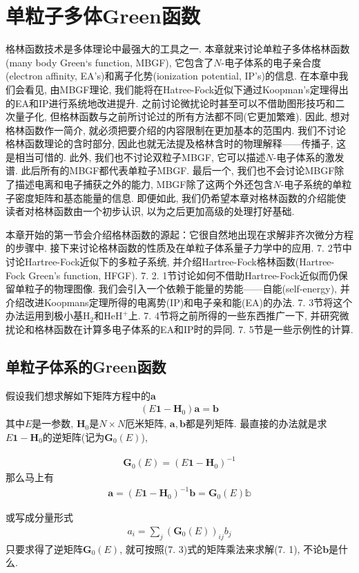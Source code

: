 \chapter{单粒子多体Green函数}
格林函数技术是多体理论中最强大的工具之一. 
本章就来讨论单粒子多体格林函数(many body Green`s function, 
MBGF), 
它包含了$N$-电子体系的电子亲合度(electron affinity, 
EA's)和离子化势(ionization potential, 
IP's)的信息. 
在本章中我们会看见, 
由MBGF理论, 
我们能将在Hatree-Fock近似下通过Koopman's定理得出的EA和IP进行系统地改进提升. 
之前讨论微扰论时甚至可以不借助图形技巧和二次量子化, 
但格林函数与之前所讨论过的所有方法都不同(它更加繁难). 
因此, 
想对格林函数作一简介, 
就必须把要介绍的内容限制在更加基本的范围内. 
我们不讨论格林函数理论的含时部分, 
因此也就无法提及格林含时的物理解释——传播子, 
这是相当可惜的. 
此外, 
我们也不讨论双粒子MBGF, 
它可以描述$N$-电子体系的激发谱. 
此后所有的MBGF都代表单粒子MBGF. 
最后一个, 
我们也不会讨论MBGF除了描述电离和电子捕获之外的能力, 
MBGF除了这两个外还包含$N$-电子系统的单粒子密度矩阵和基态能量的信息. 
即便如此, 
我们仍希望本章对格林函数的介绍能使读者对格林函数由一个初步认识, 
以为之后更加高级的处理打好基础.


本章开始的第一节会介绍格林函数的源起：它很自然地出现在求解非齐次微分方程的步骤中. 
接下来讨论格林函数的性质及在单粒子体系量子力学中的应用. 
7.
2节中讨论Hartree-Fock近似下的多粒子系统, 
并介绍Hartree-Fock格林函数(Hartree-Fock Green's function, 
HFGF). 
7.
2.
1节讨论如何不借助Hartree-Fock近似而仍保留单粒子的物理图像. 
我们会引入一个依赖于能量的势能——自能(self-energy), 
并介绍改进Koopmans定理所得的电离势(IP)和电子亲和能(EA)的办法. 
7.
3节将这个办法运用到极小基$\mathrm{H}_2$和$\mathrm{HeH}^+$上. 
7.
4节将之前所得的一些东西推广一下, 
并研究微扰论和格林函数在计算多电子体系的EA和IP时的异同. 
7.
5节是一些示例性的计算.

\section{单粒子体系的Green函数}
假设我们想求解如下矩阵方程中的$\mathbf{a}$
\begin{align}
(E\mathbf{1} - \mathbf{H}_0)\mathbf{a} = \mathbf{b}
\end{align}
其中$E$是一参数, 
$\mathbf{H}_0$是$N\times N$厄米矩阵, 
$\mathbf{a,b}$都是列矩阵. 
最直接的办法就是求$E\mathbf{1} - \mathbf{H}_0$的逆矩阵(记为$\mathbf{G}_0(E)$),

\begin{align}
\mathbf{G}_0(E) = (E\mathbf{1} - \mathbf{H}_0)^{-1}
\end{align}
那么马上有
\begin{align}
\mathbf{a} = (E\mathbf{1} - \mathbf{H}_0)^{-1}\mathbf{b} = \mathbf{G}_0(E)\mathbb{b}\tag{7.3a}
\end{align}
\addtocounter{equation}{1}
或写成分量形式
\begin{align}
a_i = \sum_j (\mathbf{G}_0(E))_{ij}b_j\tag{7.3b}
\end{align}
只要求得了逆矩阵$\mathbf{G}_0(E)$, 
就可按照(7.
3)式的矩阵乘法来求解(7.
1), 
不论$\mathbf{b}$是什么.

